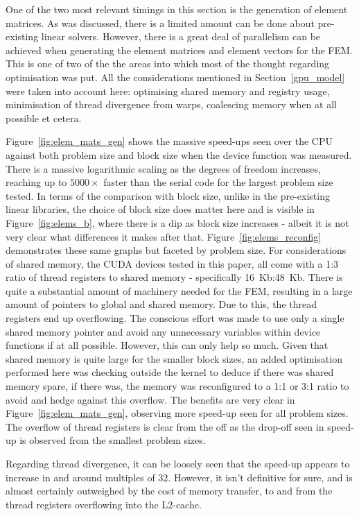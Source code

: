 One of the two most relevant timings in this section is the generation of element matrices. As was discussed, there is a limited amount can be done about pre-existing linear solvers. However, there is a great deal of parallelism can be achieved when generating the element matrices and element vectors for the FEM. This is one of two of the the areas into which most of the thought regarding optimisation was put. All the considerations mentioned in Section~\ref{gpu_model} were taken into account here: optimising shared memory and registry usage, minimisation of thread divergence from warps, coalescing memory when at all possible et cetera.

Figure~\ref{fig:elem_mats_gen} shows the massive speed-ups seen over the CPU against both problem size and block size when the device function was measured. There is a massive logarithmic scaling as the degrees of freedom increases, reaching up to $5000\times$ faster than the serial code for the largest problem size tested. In terms of the comparison with block size, unlike in the pre-existing linear libraries, the choice of block size does matter here and is visible in Figure~\ref{fig:elems_b}, where there is a dip as block size increases - albeit it is not very clear what differences it makes after that. Figure~\ref{fig:elems_reconfig} demonstrates these same graphs but faceted by problem size. For considerations of shared memory, the CUDA devices tested in this paper, all come with a 1:3 ratio of thread registers to shared memory - specifically 16~Kb:48~Kb. There is quite a substantial amount of machinery needed for the FEM, resulting in a large amount of pointers to global and shared memory. Due to this, the thread registers end up overflowing. The conscious effort was made to use only a single shared memory pointer and avoid any unnecessary variables within device functions if at all possible. However, this can only help so much. Given that shared memory is quite large for the smaller block sizes, an added optimisation performed here was checking outside the kernel to deduce if there was shared memory spare, if there was, the memory was reconfigured to a 1:1 or 3:1 ratio to avoid and hedge against this overflow. The benefits are very clear in Figure~\ref{fig:elem_mats_gen}, observing more speed-up seen for all problem sizes. The overflow of thread registers is clear from the off as the drop-off seen in speed-up is observed from the smallest problem sizes.

Regarding thread divergence, it can be loosely seen that the speed-up appears to increase in and around multiples of 32. However, it isn't definitive for sure, and is almost certainly outweighed by the cost of memory transfer, to and from the thread registers overflowing into the L2-cache.

